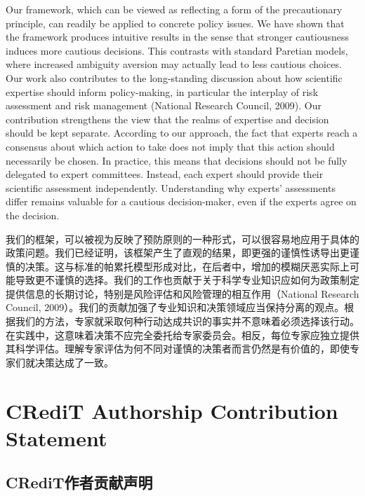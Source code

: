 \documentclass[12pt,a4paper]{article}
\newenvironment{original}
  {\par\noindent\ignorespaces}
  {\par}
\newenvironment{translation}
  {\par\noindent{\color{transblue}\ignorespaces}}
  {\par\medskip}
\begin{document}
\begin{original}
Our framework, which can be viewed as reflecting a form of the precautionary principle, can readily be applied to concrete policy issues. We have shown that the framework produces intuitive results in the sense that stronger cautiousness induces more cautious decisions. This contrasts with standard Paretian models, where increased ambiguity aversion may actually lead to less cautious choices. Our work also contributes to the long-standing discussion about how scientific expertise should inform policy-making, in particular the interplay of risk assessment and risk management (National Research Council, 2009). Our contribution strengthens the view that the realms of expertise and decision should be kept separate. According to our approach, the fact that experts reach a consensus about which action to take does not imply that this action should necessarily be chosen. In practice, this means that decisions should not be fully delegated to expert committees. Instead, each expert should provide their scientific assessment independently. Understanding why experts' assessments differ remains valuable for a cautious decision-maker, even if the experts agree on the decision.
\end{original}

\begin{translation}
我们的框架，可以被视为反映了预防原则的一种形式，可以很容易地应用于具体的政策问题。我们已经证明，该框架产生了直观的结果，即更强的谨慎性诱导出更谨慎的决策。这与标准的帕累托模型形成对比，在后者中，增加的模糊厌恶实际上可能导致更不谨慎的选择。我们的工作也贡献于关于科学专业知识应如何为政策制定提供信息的长期讨论，特别是风险评估和风险管理的相互作用（National Research Council, 2009）。我们的贡献加强了专业知识和决策领域应当保持分离的观点。根据我们的方法，专家就采取何种行动达成共识的事实并不意味着必须选择该行动。在实践中，这意味着决策不应完全委托给专家委员会。相反，每位专家应独立提供其科学评估。理解专家评估为何不同对谨慎的决策者而言仍然是有价值的，即使专家们就决策达成了一致。
\end{translation}

\newpage
\section*{CRediT Authorship Contribution Statement}
{\color{transblue}\subsection*{CRediT作者贡献声明}}
\end{document}
